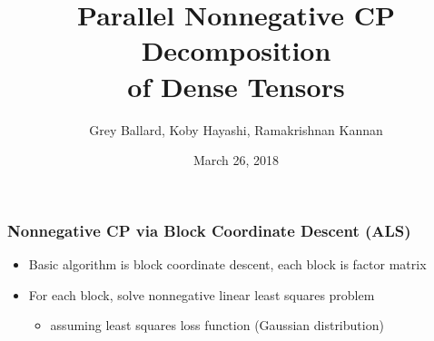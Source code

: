 \documentclass[xcolor=dvipsnames]{beamer}
\title{Parallel Nonnegative CP Decomposition \\ of Dense Tensors}
\author[]{Grey Ballard, Koby Hayashi, Ramakrishnan Kannan}
\institute{}
\date{March 26, 2018}
\begin{document}
\begin{frame}[plain]
\maketitle
\end{frame}
\addtocounter{framenumber}{-1}

\begin{frame}
\frametitle{Nonnegative CP via Block Coordinate Descent (ALS)}

\footnotesize
\begin{itemize}
	\item Basic algorithm is block coordinate descent, each block is factor matrix
	\item For each block, solve nonnegative linear least squares problem
	\begin{itemize}
		\item \scriptsize assuming least squares loss function (Gaussian distribution)
	\end{itemize}
\end{itemize}
\normalsize

\vfill


\end{frame}
\end{document}
